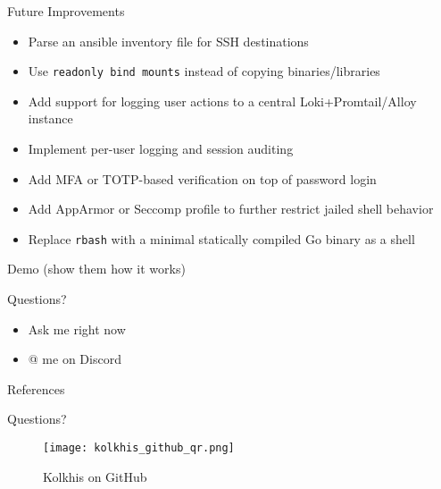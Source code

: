 \documentclass[14pt,compress,dvipsnames,aspectratio=169]{beamer} %
\begin{document}
\begin{frame}{Future Improvements}
    \begin{itemize}
        \item{Parse an ansible inventory file for SSH destinations} 
        \item{Use \texttt{readonly bind mounts} instead of copying binaries/libraries}
        \item{Add support for logging user actions to a central Loki+Promtail/Alloy instance}
        \item{Implement per-user logging and session auditing}
        \item{Add MFA or TOTP-based verification on top of password login}
        \item{Add AppArmor or Seccomp profile to further restrict jailed shell behavior}
        \item{Replace \texttt{rbash} with a minimal statically compiled Go binary as a shell}
    \end{itemize}
\end{frame}

\begin{frame}{Demo}
    (show them how it works)
\end{frame}


\begin{frame}{Questions?}
    \begin{itemize}
        \vspace{1.0cm}
        \item{Ask me right now}
        \vspace{1.0cm}
        \item{@ me on Discord} 
    \end{itemize}
\end{frame}



\begin{frame}{References}
    
    
\end{frame}

\begin{frame}{Questions?}
    \begin{figure}
        \centering
        \texttt{[image: kolkhis\_github\_qr.png]}
        \caption{Kolkhis on GitHub}
        \label{}
    \end{figure}
\end{frame}
\end{document}
